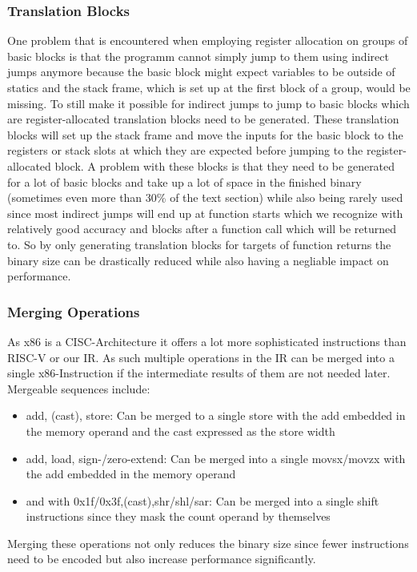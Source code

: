 \documentclass[course=eragp]{aspdoc}
\begin{document}
\subsubsection{Translation Blocks}\label{translation_blocks}
One problem that is encountered when employing register allocation on groups of basic blocks is that the programm cannot simply jump to them using indirect jumps anymore
because the basic block might expect variables to be outside of statics and the stack frame, which is set up at the first block of a group, would be missing. To still make it possible for indirect jumps to jump to basic blocks which are register-allocated translation blocks need to be generated.
These translation blocks will set up the stack frame and move the inputs for the basic block to the registers or stack slots at which they are expected before jumping to the register-allocated block.
A problem with these blocks is that they need to be generated for a lot of basic blocks and take up a lot of space in the finished binary (sometimes even more than 30\% of the \.text section) while also being rarely used
since most indirect jumps will end up at function starts which we recognize with relatively good accuracy and blocks after a function call which will be returned to.
So by only generating translation blocks for targets of function returns the binary size can be drastically reduced while also having a negliable impact on performance.

\subsubsection{Merging Operations}
As x86 is a CISC-Architecture it offers a lot more sophisticated instructions than RISC-V or our IR. As such multiple operations in the IR can be merged into a single x86-Instruction
if the intermediate results of them are not needed later.
Mergeable sequences include:
\begin{itemize}
    \item add, (cast), store: Can be merged to a single store with the add embedded in the memory operand and the cast expressed as the store width
    \item add, load, sign-/zero-extend: Can be merged into a single movsx/movzx with the add embedded in the memory operand
    \item and with 0x1f/0x3f,(cast),shr/shl/sar: Can be merged into a single shift instructions since they mask the count operand by themselves
\end{itemize}
Merging these operations not only reduces the binary size since fewer instructions need to be encoded but also increase performance significantly.
\end{document}
